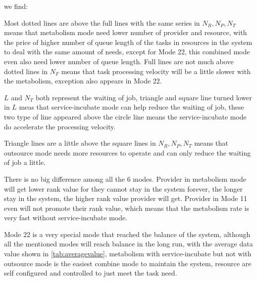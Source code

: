 we find: \begin{inparaenum}[1)]
\item Most dotted lines are above the full lines with the same series in $N_R,N_P,N_T$ means that metabolism mode need lower number of provider and resource, with the price of higher number of queue length of the tasks in resources in the system to deal with the same amount of needs, except for Mode 22, this combined mode even also need lower number of queue length. Full lines are not much above dotted lines in $N_F$ means that task processing velocity will be a little slower with the metabolism, exception also appears in Mode 22. 
\item $L$ and $N_T$ both represent the waiting of job, triangle and square line turned lower in $L$ meas that service-incubate mode can help reduce the waiting of job, these two type of line appeared above the circle line means the service-incubate mode do accelerate the processing velocity.
\item Triangle lines are a little above the square lines in $N_R,N_P,N_T$ means that outsource mode needs more resources to operate and can only reduce the waiting of job a little.
\item There is no big difference among all the 6 modes. Provider in metabolism mode will get lower rank value for they cannot stay in the system forever, the longer stay in the system, the higher rank value provider will get. Provider in Mode 11 even will not promote their rank value, which means that the metabolism rate is very fast without service-incubate mode.
\item Mode 22 is a very special mode that reached the balance of the system, although all the mentioned modes will reach balance in the long run, with the average data value shown in \autoref{tab:averagevalue}, metabolism with service-incubate but not with outsource mode is the easiest combine mode to maintain the system, resource are self configured and controlled to just meet the task need.
\end{inparaenum}

